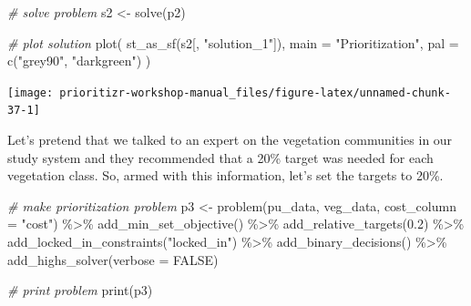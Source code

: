 \documentclass[
  12pt,
]{book}
\newenvironment{Shaded}{\begin{snugshade}}{\end{snugshade}}
\newcommand{\AttributeTok}[1]{\textcolor[rgb]{0.77,0.63,0.00}{#1}}
\newcommand{\CommentTok}[1]{\textcolor[rgb]{0.56,0.35,0.01}{\textit{#1}}}
\newcommand{\ConstantTok}[1]{\textcolor[rgb]{0.00,0.00,0.00}{#1}}
\newcommand{\FloatTok}[1]{\textcolor[rgb]{0.00,0.00,0.81}{#1}}
\newcommand{\FunctionTok}[1]{\textcolor[rgb]{0.00,0.00,0.00}{#1}}
\newcommand{\NormalTok}[1]{#1}
\newcommand{\OtherTok}[1]{\textcolor[rgb]{0.56,0.35,0.01}{#1}}
\newcommand{\SpecialCharTok}[1]{\textcolor[rgb]{0.00,0.00,0.00}{#1}}
\newcommand{\StringTok}[1]{\textcolor[rgb]{0.31,0.60,0.02}{#1}}
\begin{document}
\begin{Shaded}
\begin{Highlighting}[]
\CommentTok{\# solve problem}
\NormalTok{s2 }\OtherTok{\textless{}{-}} \FunctionTok{solve}\NormalTok{(p2)}

\CommentTok{\# plot solution}
\FunctionTok{plot}\NormalTok{(}
  \FunctionTok{st\_as\_sf}\NormalTok{(s2[, }\StringTok{"solution\_1"}\NormalTok{]), }\AttributeTok{main =} \StringTok{"Prioritization"}\NormalTok{,}
  \AttributeTok{pal =} \FunctionTok{c}\NormalTok{(}\StringTok{"grey90"}\NormalTok{, }\StringTok{"darkgreen"}\NormalTok{)}
\NormalTok{)}
\end{Highlighting}
\end{Shaded}

\begin{center}\texttt{[image: prioritizr-workshop-manual\_files/figure-latex/unnamed-chunk-37-1]} \end{center}

Let's pretend that we talked to an expert on the vegetation communities in our study system and they recommended that a 20\% target was needed for each vegetation class. So, armed with this information, let's set the targets to 20\%.

\begin{Shaded}
\begin{Highlighting}[]
\CommentTok{\# make prioritization problem}
\NormalTok{p3 }\OtherTok{\textless{}{-}} \FunctionTok{problem}\NormalTok{(pu\_data, veg\_data, }\AttributeTok{cost\_column =} \StringTok{"cost"}\NormalTok{) }\SpecialCharTok{\%\textgreater{}\%}
      \FunctionTok{add\_min\_set\_objective}\NormalTok{() }\SpecialCharTok{\%\textgreater{}\%}
      \FunctionTok{add\_relative\_targets}\NormalTok{(}\FloatTok{0.2}\NormalTok{) }\SpecialCharTok{\%\textgreater{}\%}
      \FunctionTok{add\_locked\_in\_constraints}\NormalTok{(}\StringTok{"locked\_in"}\NormalTok{) }\SpecialCharTok{\%\textgreater{}\%}
      \FunctionTok{add\_binary\_decisions}\NormalTok{() }\SpecialCharTok{\%\textgreater{}\%}
      \FunctionTok{add\_highs\_solver}\NormalTok{(}\AttributeTok{verbose =} \ConstantTok{FALSE}\NormalTok{)}

\CommentTok{\# print problem}
\FunctionTok{print}\NormalTok{(p3)}
\end{Highlighting}
\end{Shaded}
\end{document}
